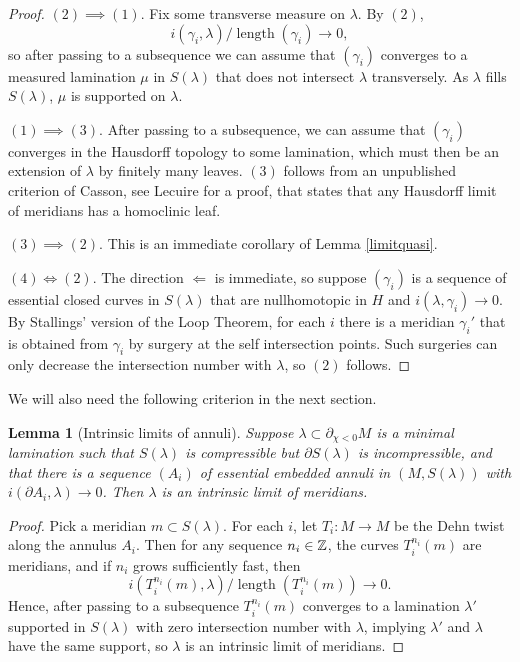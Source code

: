 \documentclass[12pt]{amsart}
\newtheorem{lemma}[theorem]{Lemma}
\theoremstyle{definition}
\theoremstyle{remark}
\DeclareMathOperator{\length}{length}
\begin{document}
\begin {proof}
$(2) \implies (1)$.  Fix some transverse measure on $\lambda$. By $(2)$,  $$i(\gamma_i,\lambda) / \length(\gamma_i) \to 0,$$ so after passing to a subsequence  we can assume that $(\gamma_i)$  converges to a measured lamination $\mu$ in $S(\lambda)$ that  does not intersect $\lambda$  transversely. As $\lambda$ fills $S(\lambda)$, $\mu$ is supported on $\lambda $.

$(1) \implies (3)$.  After passing to a subsequence,  we can assume that $(\gamma_i)$ converges in the  Hausdorff topology to some lamination, which must then be  an extension of $\lambda $ by finitely many leaves. $(3)$ follows from an unpublished criterion of Casson, see Lecuire \cite[Th\'eor\`eme B.1]{Lecuireplissage} for a proof,  that states that any Hausdorff limit of meridians has a homoclinic leaf.%

$(3) \implies (2)$. This is an immediate corollary of Lemma \ref{limitquasi}.

$(4) \iff (2)$.  The direction  $\Leftarrow$ is immediate, so  suppose $(\gamma_i)$  is a sequence of essential closed curves  in $S (\lambda) $  that are nullhomotopic  in $H $ and $i(\lambda,\gamma_i)\to 0$.  By Stallings' version of the Loop Theorem,  for each $i $ there is a meridian $\gamma_i'$ that is obtained from $\gamma_i$  by surgery at the self intersection points.  Such surgeries can only decrease the intersection number with $\lambda $, so $(2)$ follows.
\end {proof}

 We will also need the following criterion in the next section.

\begin{lemma}[Intrinsic limits of annuli]
 Suppose $\lambda \subset \partial_{\chi<0} M$ is a minimal lamination such that $S(\lambda)$ is compressible but $\partial S(\lambda)$ is incompressible, and that  there is a sequence $(A_i)$ of essential  embedded annuli  in $(M, S(\lambda))$  with $i (\partial A_i,\lambda)\to 0$.  Then $\lambda $ is an intrinsic limit of meridians.\label {annualilimit}
\end{lemma}

\begin {proof}
Pick a meridian $m  \subset S(\lambda)$. For each $i$, let $T_i : M \longrightarrow M$ be the Dehn twist along the annulus $A_i$. Then for any sequence $n_i \in \mathbb Z$, the curves $T_i^{n_i}(m)$ are meridians, and if $n_i$ grows sufficiently fast, then $$i(T_i^{n_i}(m),\lambda)/\length(T_i^{n_i}(m)) \to 0.$$ Hence, after passing to a subsequence $T_i^{n_i}(m)$ converges to a lamination $\lambda'$ supported in $S(\lambda)$ with zero intersection number with $\lambda$, implying $\lambda'$ and $\lambda$ have the same support, so $\lambda$  is an  intrinsic limit of meridians.
\end {proof}
\end{document}
